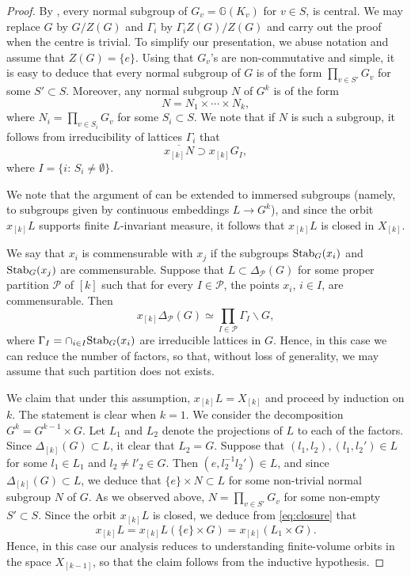 \documentclass[11pt,reqno,a4paper]{amsart}
\numberwithin{equation}{section}
\newcommand{\cP}{\mathcal{P}}
\newcommand{\bG}{\mathbb{G}}
\theoremstyle{theorem}
\theoremstyle{definition}
\begin{document}
\begin{proof}
	By \cite[\S7.2]{PR},
	every normal subgroup of $G_v=\bG(K_v)$ for $v\in S$,
	is central. We may replace $G$ by $G/Z(G)$ and $\Gamma_i$ by $\Gamma_i Z(G)/Z(G)$
	and carry out the proof when the centre is trivial. 
	To simplify our presentation, we abuse notation and assume that $Z(G)=\{e\}$.
	Using that $G_v$'s are non-commutative and simple,
	it is easy to deduce that every normal subgroup of $G$ is of the form
	$\prod_{v\in S'} G_v$ for some $S'\subset S$.
	Moreover, any normal subgroup $N$ of $G^{k}$  is of the form 
	\begin{equation}
	\label{eq:N}
	N=N_1\times \cdots \times N_k,
	\end{equation}
	where $N_i=\prod_{v\in S_i} G_v$ for some $S_i\subset S$.
	We note that if $N$ is such a subgroup, it follows from irreducibility of lattices $\Gamma_i$ that
	\begin{equation}
	\label{eq:closure}
	\overline{x_{[k]} N} \supset x_{[k]} G_I,
	\end{equation}
	where $I=\{i:\, S_i\ne \emptyset\}$.

	We note that the argument of \cite[Th.~1.13]{rag}
	can be extended to immersed subgroups (namely, to subgroups given by 
	continuous embeddings $L\to G^{k}$), and 
	since the orbit $x_{[k]}L$ supports finite $L$-invariant measure,
	it follows that $x_{[k]}L$ is closed in $X_{[k]}$.
	
	We say that $x_i$ is commensurable with $x_j$ if the subgroups $\hbox{Stab}_G(x_i)$  and $\hbox{Stab}_G(x_j)$ are commensurable.
	Suppose that $L\subset \Delta_\cP(G)$ for some 
	proper partition $\cP$ of $[k]$
	such that for every $I\in \cP$, the points $x_i$, $i\in I$,
	are commensurable. Then 
	$$
	x_{[k]}\Delta_\cP(G)\simeq \prod_{I\in \cP} \Gamma_I\backslash G,
	$$
	where $\Gamma_I=\cap_{i\in I} \hbox{Stab}_G(x_i)$ are irreducible lattices in $G$. Hence, in this case we can reduce the number of factors,
	so that, without loss of generality, we may assume that such partition does not exists.
	
	We claim that under this assumption, $x_{[k]}L=X_{[k]}$  and proceed by 
	induction on $k$. The statement is clear when $k=1$. 
	We consider the decomposition $G^{k}=G^{k-1}\times G$.
	Let $L_1$ and $L_2$ denote the projections of $L$ to
	each of the factors. Since $\Delta_{[k]}(G)\subset L$,  it clear that $L_2=G$.
	Suppose that $(l_1,l_2),(l_1,l_2')\in L$ for some $l_1\in L_1$ and $l_2\ne l'_2\in G$.
	Then $(e,l_2^{-1}l_2')\in L$, and since $\Delta_{[k]}(G)\subset L$,
	we deduce that $\{e\}\times N\subset L$ for some non-trivial normal subgroup $N$	of $G$. As we observed above, $N=\prod_{v\in S'} G_v$ for some non-empty $S'\subset S$.
	Since the orbit $x_{[k]}L$ is closed,
	we deduce from \eqref{eq:closure} that 
	$$
	x_{[k]}L=x_{[k]}L(\{e\}\times G)=x_{[k]}(L_1\times G).
	$$
	Hence, in this case our analysis reduces to understanding finite-volume orbits in the space $X_{[k-1]}$, so that the claim follows from the inductive hypothesis.
	

\end{proof}
\end{document}
